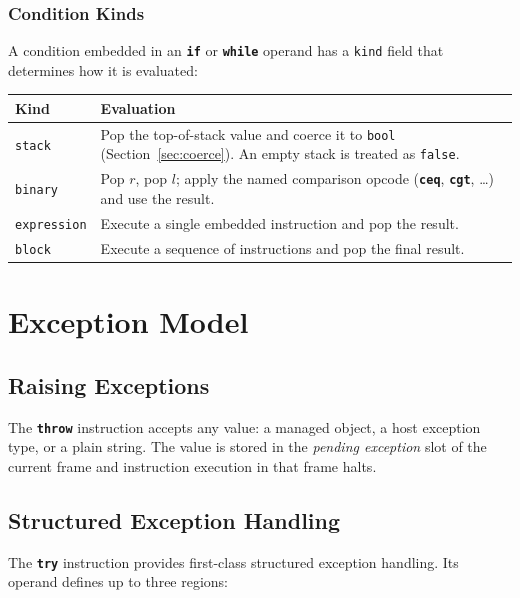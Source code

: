 \documentclass[11pt,a4paper]{article}
\newcommand{\code}[1]{\texttt{\small #1}}
\newcommand{\opcode}[1]{\textbf{\texttt{#1}}}
\begin{document}
\subsubsection{Condition Kinds}
\label{sec:conditions}

A condition embedded in an \opcode{if} or \opcode{while} operand has a
\texttt{kind} field that determines how it is evaluated:

\begin{longtable}{lp{10cm}}
  \toprule
  \textbf{Kind}       & \textbf{Evaluation} \\
  \midrule
  \endhead
  \code{stack}      &
    Pop the top-of-stack value and coerce it to \texttt{bool}
    (Section~\ref{sec:coerce}).
    An empty stack is treated as \texttt{false}. \\
  \code{binary}     &
    Pop $r$, pop $l$; apply the named comparison opcode
    (\opcode{ceq}, \opcode{cgt}, \ldots) and use the result. \\
  \code{expression} &
    Execute a single embedded instruction and pop the result. \\
  \code{block}      &
    Execute a sequence of instructions and pop the final result. \\
  \bottomrule
\end{longtable}

\section{Exception Model}
\label{sec:exceptions}

\subsection{Raising Exceptions}

The \opcode{throw} instruction accepts any value: a managed object, a host
exception type, or a plain string. The value is stored in the
\emph{pending exception} slot of the current frame and instruction execution
in that frame halts.

\subsection{Structured Exception Handling}

The \opcode{try} instruction provides first-class structured exception
handling. Its operand defines up to three regions:
\end{document}
